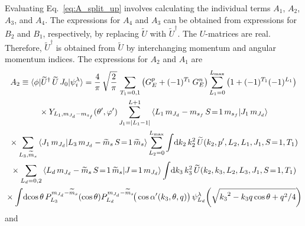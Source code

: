   Evaluating Eq.~\eqref{eq:A_split_up} involves calculating the individual terms
  $A_1$, $A_2$, $A_3$, and $A_4$.  The expressions for $A_4$ and $A_3$ can be
  obtained from expressions for $B_2$ and $B_1$, respectively, by replacing
  $\widetilde{U}$ with $\widetilde{U}^\dag$.  The $U$-matrices are real.
  Therefore, $\widetilde{U}^\dag$ is obtained from $\widetilde{U}$ by
  interchanging momentum and angular momentum indices.  The expressions for
  $A_2$ and $A_1$ are
  \begin{multline}
   A_2 \equiv \la \phi | \widetilde{U}^\dag \, \widetilde{U}\, J_0 |
   \psi_i^\lambda \ra  = \frac{4}{\pi} \, \sqrt{\frac{2}{\pi}} \,
   \sum_{T_1 = 0,1} \big(G_E ^p + (-1)^{T_1} \, G_E^n\big)
   \sum_{L_1 = 0}^{L_{\rm max}} \big(1 + (-1)^{T_1} (-1)^{L_1}\big) \\
   \null \times  Y_{L_1 , \mJd - \msf} (\thetacm, \phicm)
   \sum_{J_1 = |L_1 - 1|}^{L+1}
   \CG{L_1}{\mJd-\msf}{S\!=\!1}{\msf}{J_1}{\mJd} \\
   \null \times
   \sum_{L_3, \widetilde{m}_s}
   \braket{J_1 \, \mJd}{L_3 \, \mJd - \wt{m}_s \, S\!=\!1 \, \wt{m}_s}
   \sum_{L_2 = 0}^{L_{\rm max}} \int \! \dd k_2 \, k_2^2 \,
   \widetilde{U} (k_2, \pp, L_2, L_1, J_1, S\!=\!1, T_1) \\
   \null \times
   \sum_{L_d = 0, 2}
   \CG{L_d}{\mJd-\widetilde{m}_s}{S\!=\!1}{\widetilde{m}_s}{J\!=\!1}{\mJd}
   \int \! \dd k_3 \, k_3^2 \,
   \widetilde{U} (k_2, k_3, L_2, L_3, J_1, S\!=\!1, T_1) \\
   \null \times
   \int \! \dcostheta \,P_{L_3}^{\mJd - \widetilde{m}_s}(\cos\theta)
   P_{L_d}^{\mJd - \widetilde{m}_s}\!\big(
   \cos\thetacprime(k_3, \theta, q)\big) \,
   \psi_{L_d}^\lambda\!\left(\sqrt{{k_3}^2 - k_3 q \cos\theta + q^2/4} \right)
  \end{multline}
  and

